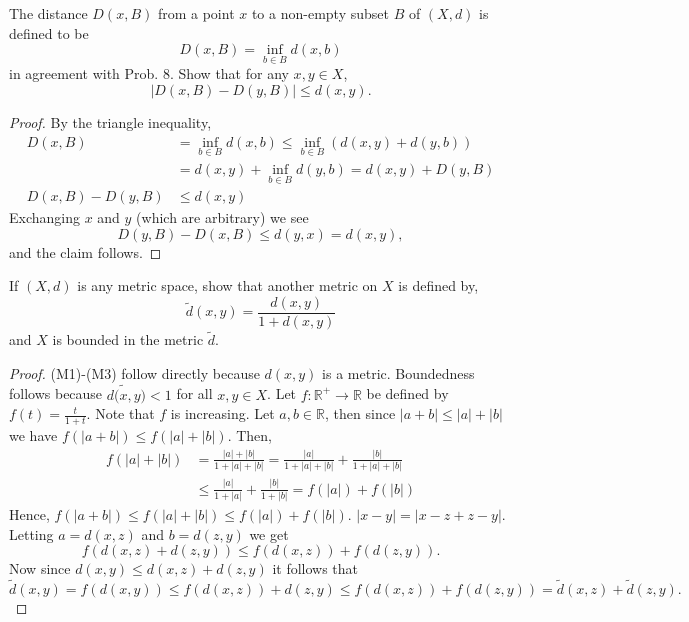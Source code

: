 \documentclass[12pt]{article}
\newcommand{\R}{\mathbb{R}}
\newenvironment{exercise}[2][Exercise]{\begin{trivlist}
\item[\hskip \labelsep {\bfseries #1}\hskip \labelsep {\bfseries #2.}]}{\end{trivlist}}
\begin{document}
\begin{exercise}{1.2.10}
    The distance $D(x, B)$ from a point $x$ to a non-empty subset $B$ of $(X, d)$ is defined to be
    \[ D(x, B) = \inf_{b \in B} d(x, b) \]
    in agreement with Prob. 8. Show that for any $x, y \in X$,
    \[ |D(x, B) - D(y, B)| \leq d(x, y). \]
\end{exercise}
\begin{proof}
    By the triangle inequality,
    \begin{align*}
        D(x, B) &= \inf_{b \in B} d(x, b) \leq \inf_{b \in B} (d(x, y) + d(y, b)) \\
        &= d(x, y) + \inf_{b \in B} d(y, b) = d(x, y) + D(y, B) \\
        D(x, B) - D(y, B) &\leq d(x, y)
    \end{align*}
    Exchanging $x$ and $y$ (which are arbitrary) we see
    \[ D(y, B) - D(x, B) \leq d(y, x) = d(x, y), \]
    and the claim follows.
\end{proof}

\begin{exercise}{1.2.11}
    If $(X, d)$ is any metric space, show that another metric on $X$ is defined by,
    \[ \tilde{d} (x, y) = \frac{d(x, y)}{1 + d(x, y)}  \]
    and $X$ is bounded in the metric $\tilde{d}$.
\end{exercise}
\begin{proof}
    (M1)-(M3) follow directly because $d(x, y)$ is a metric. Boundedness follows because $\tilde{d(x, y}) < 1$ for all $x, y \in X$. Let $f: \R^{+} \to \R$ be defined by $f(t) = \frac{t}{1+t}$. Note that $f$ is increasing. Let $a, b \in \R$, then since $|a+b| \leq |a| + |b|$ we have $f(|a+b|) \leq f(|a| + |b|)$. Then,
    \begin{align*}
        f(|a| + |b|) &= \frac{|a| + |b|}{1 + |a| + |b|} = \frac{|a|}{1 + |a| +|b|} + \frac{|b|}{1 + |a| + |b|} \\
        &\leq \frac{|a|}{1 + |a|} + \frac{|b|}{1 + |b|} = f(|a|) + f(|b|)
    \end{align*}
    Hence, $f(|a+b|) \leq f(|a| + |b|) \leq f(|a|) + f(|b|)$. $|x-y| = |x-z + z-y|$. Letting $a = d(x, z)$ and $b = d(z, y)$ we get
    \[ f(d(x, z) + d(z, y)) \leq f(d(x, z)) + f(d(z, y)).\]
    Now since $d(x, y) \leq d(x, z) + d(z, y)$ it follows that
    \[ \tilde{d}(x, y) = f(d(x, y)) \leq f(d(x, z)) + d(z, y) \leq f(d(x, z)) + f(d(z, y)) = \tilde{d} (x, z) + \tilde{d} (z, y). \]
\end{proof}
\end{document}
